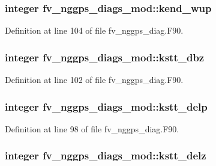 \subsubsection[{kend\-\_\-wup}]{\setlength{\rightskip}{0pt plus 5cm}integer fv\-\_\-nggps\-\_\-diags\-\_\-mod\-::kend\-\_\-wup\hspace{0.3cm}{\ttfamily [private]}}\label{classfv__nggps__diags__mod_a117adcb804018f56ea41b9582964a174}


Definition at line 104 of file fv\-\_\-nggps\-\_\-diag.\-F90.

\subsubsection[{kstt\-\_\-dbz}]{\setlength{\rightskip}{0pt plus 5cm}integer fv\-\_\-nggps\-\_\-diags\-\_\-mod\-::kstt\-\_\-dbz\hspace{0.3cm}{\ttfamily [private]}}\label{classfv__nggps__diags__mod_a6197e3be2df8bd2599697c61d5ed950c}


Definition at line 102 of file fv\-\_\-nggps\-\_\-diag.\-F90.

\subsubsection[{kstt\-\_\-delp}]{\setlength{\rightskip}{0pt plus 5cm}integer fv\-\_\-nggps\-\_\-diags\-\_\-mod\-::kstt\-\_\-delp\hspace{0.3cm}{\ttfamily [private]}}\label{classfv__nggps__diags__mod_a07543cb41e9f75914dc6f63a434dcbb7}


Definition at line 98 of file fv\-\_\-nggps\-\_\-diag.\-F90.

\subsubsection[{kstt\-\_\-delz}]{\setlength{\rightskip}{0pt plus 5cm}integer fv\-\_\-nggps\-\_\-diags\-\_\-mod\-::kstt\-\_\-delz\hspace{0.3cm}{\ttfamily [private]}}\label{classfv__nggps__diags__mod_a3d23cc53d5a05338874318b17773b5ad}


